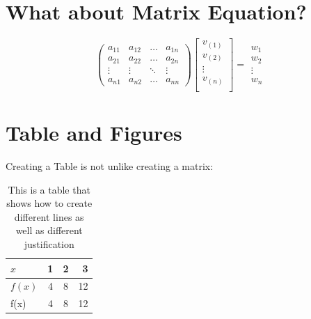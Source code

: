 \documentclass[a4paper]{article}
\begin{document}
\section{What about Matrix Equation?} 
\begin{equation*}
\begin{pmatrix}
a_{11} & a_{12} & \dots & a_{1n}\\
a_{21} & a_{22} & \dots & a_{2n}\\
\vdots & \vdots & \ddots & \vdots\\
a_{n1} & a_{n2}& \dots & a_{nn}
\end{pmatrix}
\begin{bmatrix}
v_(1)\\
v_(2)\\
\vdots\\
v_(n)\\
\end{bmatrix}
=
\begin{matrix}
w_{1}\\ w_{2}\\ \vdots \\ w_{n}
\end{matrix}
\end{equation*}

\section{Table and Figures} %
Creating a Table is not unlike creating a matrix:\\
\begin{table}[h]
\centering
\caption{This is a table that shows how to create different lines as well as different justification}
\begin{tabular}{|l||c|c|r|}
\hline  
$x$&1&2&3\\
\hline
$f(x)$&4&8&12\\
f(x)&4&8&12\\
\hline
\end{tabular}
\end{table}

 
\end{document}
